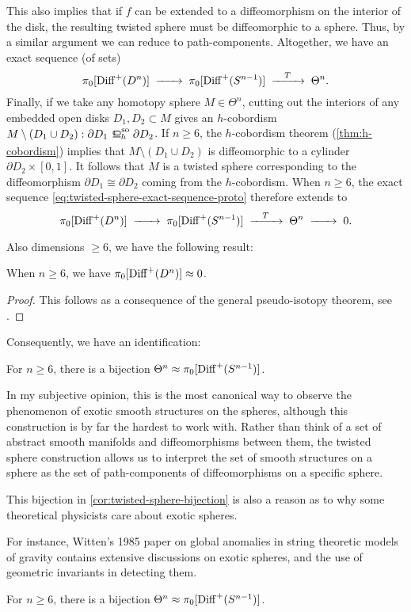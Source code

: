 	This also implies that if $f$ can be extended to a diffeomorphism on the interior of the disk, the resulting twisted sphere must be diffeomorphic to a sphere. Thus, by a similar argument we can reduce to path-components. Altogether, we have an exact sequence (of sets)
	\begin{equation}\label{eq:twisted-sphere-exact-sequence-proto}
		\pi_0 [\Diff^+(D^n)] \lkxto \pi_0 [\Diff^+(S^{n-1})] \lkxto[T] \Theta^n.
	\end{equation}
	Finally, if we take any homotopy sphere $M\in \Theta^n$, cutting out the interiors of any embedded open disks $D_1, D_2\subset M$ gives an $h$-cobordism $M\setminus(D_1\cup D_2) : \partial D_1 \sohbord \partial D_2$. If $n\geq 6$, the $h$-cobordism theorem (\ref{thm:h-cobordism}) implies that $M \setminus (D_1\cup D_2)$ is diffeomorphic to a cylinder $\partial D_2\times [0,1]$. It follows that $M$ is a twisted sphere corresponding to the diffeomorphism $\partial D_1 \cong \partial D_2$ coming from the $h$-cobordism.
	When $n\geq 6$, the exact sequence \cref{eq:twisted-sphere-exact-sequence-proto} therefore extends to 
	\[
		\pi_0 [\Diff^+(D^n)] \lkxto \pi_0 [\Diff^+(S^{n-1})] \lkxto[T] \Theta^n \lkxto 0.
	\]

	Also dimensions $\geq 6$, we have the following result:
	\begin{theorem}[Cerf]
		When $n\geq 6$, we have $\pi_0[\operatorname{Diff}^+(D^n)]\approx 0$.
	\end{theorem}
	\begin{proof}
		This follows as a consequence of the general pseudo-isotopy theorem, see \cite{cerf1970pseudoisotopy}.
	\end{proof}

	Consequently, we have an identification:

	\begin{corollary}\label{cor:twisted-sphere-bijection}
		For $n\geq 6$, there is a bijection $\Theta^n \approx \pi_0[\operatorname{Diff}^+(S^{n-1})]$.
	\end{corollary}

	In my subjective opinion, this is the most canonical way to observe the phenomenon of exotic smooth structures on the spheres, although this construction is by far the hardest to work with. Rather than think of a set of abstract smooth manifolds and diffeomorphisms between them, the twisted sphere construction allows us to interpret the set of smooth structures on a sphere as the set of path-components of diffeomorphisms on a specific sphere. 


	This bijection in \cref{cor:twisted-sphere-bijection} is also a reason as to why some theoretical physicists care about exotic spheres.

	For instance, Witten's 1985 paper \cite{witten1985anomalies} on global anomalies in string theoretic models of gravity contains extensive discussions on exotic spheres, and the use of geometric invariants in detecting them.

\begin{theorem}
  For $n\geq 6$, there is a bijection $\Theta^n \approx \pi_0[\operatorname{Diff}^+(S^{n-1})]$.
\end{theorem}
